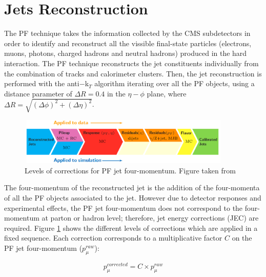 \section{Jets Reconstruction}
\label{sec:Jet}


The PF technique \cite{CMS-PAS-PFT-09-001} takes the information collected by the CMS subdetectors in order to identify and reconstruct
all the vissible final-state particles (electrons, muons, photons, charged hadrons and neutral hadrons) produced
in the hard interaction. The PF technique reconstructs the jet constituents individually from the
combination of tracks and calorimeter clusters. Then, the jet reconstruction is performed
with the anti$-$k$_{T}$ algorithm \cite{AntiKTAlgorithm} iterating over all the PF objects, using a distance parameter of
$\Delta R = 0.4$ in the $\eta-\phi$ plane, where $\Delta R = \sqrt{(\Delta \phi)^2+(\Delta \eta)^2}$.\\

\begin{figure}%
  \begin{center}
    \includegraphics[width=0.9\textwidth]{figuras/Chapter3/JEC_levels.png}
    \caption{Levels of corrections for PF jet four-momentum. Figure taken from \cite{JESandJER}}
    \label{fig:JEC_levels}
  \end{center}
\end{figure}

The four-momentum of the reconstructed jet is the addition of the four-momenta of all the PF objects associated to the jet. However
due to detector responses and experimental effects, the PF jet four-momentum does not correspond to the four-momentum
at parton or hadron level; therefore, jet energy corrections (JEC) are required. Figure \ref{fig:JEC_levels} shows the different
levels of corrections which are applied in a fixed sequence. Each correction corresponds to a multiplicative factor $C$ on
the PF jet four-momentum ($p_{\mu}^{raw}$):

\begin{equation}
 p_{\mu}^{corrected} = C \times p_{\mu}^{raw}
\end{equation}

